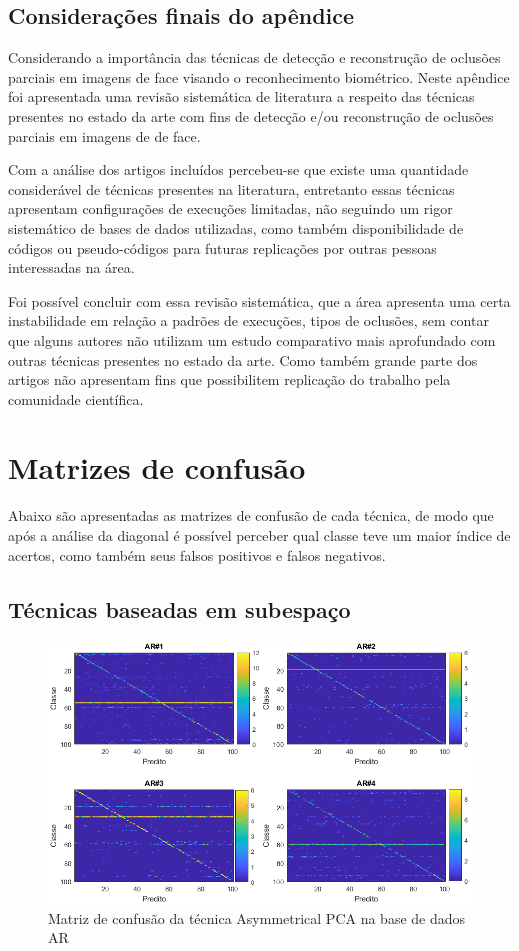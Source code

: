 \section{Considerações finais do apêndice}

Considerando a importância das técnicas de detecção e reconstrução de oclusões parciais em imagens de face visando o reconhecimento biométrico. Neste apêndice foi apresentada uma revisão sistemática de literatura a respeito das técnicas presentes no estado da arte com fins de detecção e/ou reconstrução de oclusões parciais em imagens de de face.

Com a análise dos artigos incluídos percebeu-se que existe uma quantidade considerável de técnicas presentes na literatura, entretanto essas técnicas apresentam configurações de execuções limitadas, não seguindo um rigor sistemático de bases de dados utilizadas, como também disponibilidade de códigos ou pseudo-códigos para futuras replicações por outras pessoas interessadas na área.

Foi possível concluir com essa revisão sistemática, que a área apresenta uma certa instabilidade em relação a padrões de execuções, tipos de oclusões, sem contar que alguns autores não utilizam um estudo comparativo mais aprofundado com outras técnicas presentes no estado da arte. Como também grande parte dos artigos não apresentam fins que possibilitem replicação do trabalho pela comunidade científica.


\chapter{Matrizes de confusão}
\label{apen6:matrizes_confusao}
Abaixo são apresentadas as matrizes de confusão de cada técnica, de modo que após a análise da diagonal é possível perceber qual classe teve um maior índice de acertos, como também seus falsos positivos e falsos negativos.

\section{Técnicas baseadas em subespaço}

\begin{figure}[H]
\caption{Matriz de confusão da técnica Asymmetrical PCA na base de dados AR}
\centering
\includegraphics[scale = 0.65]{imgs4/matrizes_confusao/APCA}
\end{figure}

